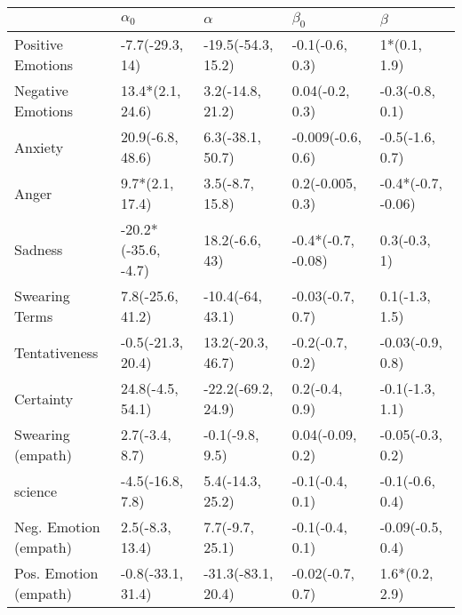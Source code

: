 \begin{tabular}{lllll}
\toprule
{} &           $\alpha_0$ &            $\alpha$ &           $\beta_0$ &             $\beta$ \\
\midrule
Positive Emotions     &      -7.7(-29.3, 14) &  -19.5(-54.3, 15.2) &     -0.1(-0.6, 0.3) &        1*(0.1, 1.9) \\
Negative Emotions     &     13.4*(2.1, 24.6) &    3.2(-14.8, 21.2) &     0.04(-0.2, 0.3) &     -0.3(-0.8, 0.1) \\
Anxiety               &     20.9(-6.8, 48.6) &    6.3(-38.1, 50.7) &   -0.009(-0.6, 0.6) &     -0.5(-1.6, 0.7) \\
Anger                 &      9.7*(2.1, 17.4) &     3.5(-8.7, 15.8) &    0.2(-0.005, 0.3) &  -0.4*(-0.7, -0.06) \\
Sadness               &  -20.2*(-35.6, -4.7) &      18.2(-6.6, 43) &  -0.4*(-0.7, -0.08) &        0.3(-0.3, 1) \\
Swearing Terms        &     7.8(-25.6, 41.2) &    -10.4(-64, 43.1) &    -0.03(-0.7, 0.7) &      0.1(-1.3, 1.5) \\
Tentativeness         &    -0.5(-21.3, 20.4) &   13.2(-20.3, 46.7) &     -0.2(-0.7, 0.2) &    -0.03(-0.9, 0.8) \\
Certainty             &     24.8(-4.5, 54.1) &  -22.2(-69.2, 24.9) &      0.2(-0.4, 0.9) &     -0.1(-1.3, 1.1) \\
Swearing (empath)     &       2.7(-3.4, 8.7) &     -0.1(-9.8, 9.5) &    0.04(-0.09, 0.2) &    -0.05(-0.3, 0.2) \\
science               &     -4.5(-16.8, 7.8) &    5.4(-14.3, 25.2) &     -0.1(-0.4, 0.1) &     -0.1(-0.6, 0.4) \\
Neg. Emotion (empath) &      2.5(-8.3, 13.4) &     7.7(-9.7, 25.1) &     -0.1(-0.4, 0.1) &    -0.09(-0.5, 0.4) \\
Pos. Emotion (empath) &    -0.8(-33.1, 31.4) &  -31.3(-83.1, 20.4) &    -0.02(-0.7, 0.7) &      1.6*(0.2, 2.9) \\
\bottomrule
\end{tabular}
